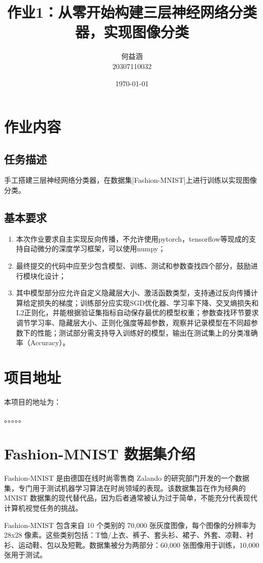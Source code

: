 \documentclass[a4paper,12pt]{article}
\title{作业1：从零开始构建三层神经网络分类器，实现图像分类}
\author{何益涵 \\ 20307110032}
\date{\today}
\begin{document}
\maketitle


\section{作业内容}
\subsection{任务描述}
手工搭建三层神经网络分类器，在数据集[Fashion-MNIST]上进行训练以实现图像分类。

\subsection{基本要求}
\begin{enumerate}
\item 本次作业要求自主实现反向传播，不允许使用pytorch，tensorflow等现成的支持自动微分的深度学习框架，可以使用numpy；
\item 最终提交的代码中应至少包含模型、训练、测试和参数查找四个部分，鼓励进行模块化设计；
\item 其中模型部分应允许自定义隐藏层大小、激活函数类型，支持通过反向传播计算给定损失的梯度；训练部分应实现SGD优化器、学习率下降、交叉熵损失和L2正则化，并能根据验证集指标自动保存最优的模型权重；参数查找环节要求调节学习率、隐藏层大小、正则化强度等超参数，观察并记录模型在不同超参数下的性能；测试部分需支持导入训练好的模型，输出在测试集上的分类准确率（Accuracy）。
\end{enumerate}

\section{项目地址}
本项目的地址为：

。。。。。

\section{Fashion-MNIST 数据集介绍}

Fashion-MNIST 是由德国在线时尚零售商 Zalando 的研究部门开发的一个数据集，专门用于测试机器学习算法在时尚领域的表现。该数据集旨在作为经典的 MNIST 数据集的现代替代品，因为后者通常被认为过于简单，不能充分代表现代计算机视觉任务的挑战。

Fashion-MNIST 包含来自 10 个类别的 70,000 张灰度图像，每个图像的分辨率为 28x28 像素。这些类别包括：T恤/上衣、裤子、套头衫、裙子、外套、凉鞋、衬衫、运动鞋、包以及短靴。数据集被分为两部分：60,000 张图像用于训练，10,000 张用于测试。
\end{document}
